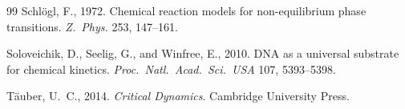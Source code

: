 \documentclass[11pt,a4paper]{article}
\theoremstyle{plain}
\theoremstyle{remark}
\begin{document}
\begin{thebibliography}{99}
Schlögl, F., 1972. Chemical reaction models for non-equilibrium phase transitions. \textit{Z.\ Phys.} 253, 147--161.

Soloveichik, D., Seelig, G., and Winfree, E., 2010. DNA as a universal substrate for chemical kinetics. \textit{Proc.\ Natl.\ Acad.\ Sci.\ USA} 107, 5393--5398.

Täuber, U.~C., 2014. \textit{Critical Dynamics}. Cambridge University Press.

\end{thebibliography}
\end{document}

